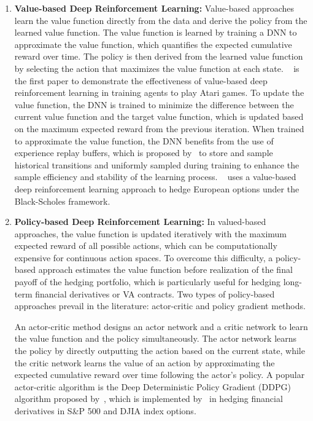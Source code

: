 \begin{enumerate}
    \item \textbf{Value-based Deep Reinforcement Learning:} Value-based approaches learn the value function directly from the data and derive the policy from the learned value function. 
    The value function is learned by training a DNN to approximate the value function, which quantifies the expected cumulative reward over time. 
    The policy is then derived from the learned value function by selecting the action that maximizes the value function at each state. 
    ~\cite{mnih2015human} is the first paper to demonstrate the effectiveness of value-based deep reinforcement learning in training agents to play Atari games.
    To update the value function, the DNN is trained to minimize the difference between the current value function and the target value function, which is updated based on the maximum expected reward from the previous iteration.
    When trained to approximate the value function, the DNN benefits from the use of experience replay buffers, which is proposed by~\cite{lin1992self} to store and sample historical transitions and uniformly sampled during training to enhance the sample efficiency and stability of the learning process.
    ~\cite{kolm2019dynamic} uses a value-based deep reinforcement learning approach to hedge European options under the Black-Scholes framework.

    \item \textbf{Policy-based Deep Reinforcement Learning:}
    In valued-based approaches, the value function is updated iteratively with the maximum expected reward of all possible actions, which can be computationally expensive for continuous action spaces.
    To overcome this difficulty, a policy-based approach estimates the value function before realization of the final payoff of the hedging portfolio, which is particularly useful for hedging long-term financial derivatives or VA contracts.
    Two types of policy-based approaches prevail in the literature: actor-critic and policy gradient methods.

    An actor-critic method designs an actor network and a critic network to learn the value function and the policy simultaneously.
    The actor network learns the policy by directly outputting the action based on the current state, while the critic network learns the value of an action by approximating the expected cumulative reward over time following the actor's policy.
    A popular actor-critic algorithm is the Deep Deterministic Policy Gradient (DDPG) algorithm proposed by~\cite{lillicrap2015continuous}, which is implemented by~\cite{xu2022delta} in hedging financial derivatives in S\&P 500 and DJIA index options.
    

\end{enumerate}
